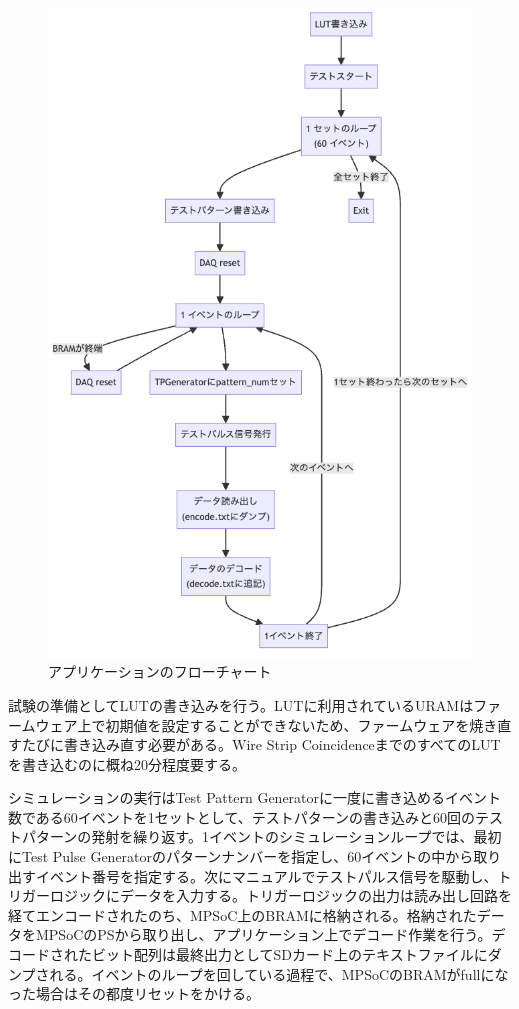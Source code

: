 \begin{figure} 
\centering
\includegraphics[width=16cm]{fig/Test/Flowchart.png}
\caption[アプケーションのフローチャート]{アプリケーションのフローチャート}
\label{Flowchart}
\end{figure}

試験の準備としてLUTの書き込みを行う。LUTに利用されているURAMはファームウェア上で初期値を設定することができないため、ファームウェアを焼き直すたびに書き込み直す必要がある。Wire Strip CoincidenceまでのすべてのLUTを書き込むのに概ね20分程度要する。

シミュレーションの実行はTest Pattern Generatorに一度に書き込めるイベント数である60イベントを1セットとして、テストパターンの書き込みと60回のテストパターンの発射を繰り返す。1イベントのシミュレーションループでは、最初にTest Pulse Generatorのパターンナンバーを指定し、60イベントの中から取り出すイベント番号を指定する。次にマニュアルでテストパルス信号を駆動し、トリガーロジックにデータを入力する。トリガーロジックの出力は読み出し回路を経てエンコードされたのち、MPSoC上のBRAMに格納される。格納されたデータをMPSoCのPSから取り出し、アプリケーション上でデコード作業を行う。デコードされたビット配列は最終出力としてSDカード上のテキストファイルにダンプされる。イベントのループを回している過程で、MPSoCのBRAMがfullになった場合はその都度リセットをかける。

